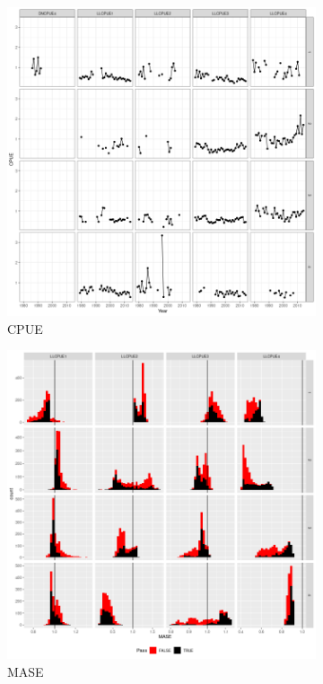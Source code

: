 \begin{figure}
        \begin{subfigure}[b]{0.5\textwidth}
           \includegraphics[width=\linewidth]{figures/cpue.png}
                \caption{CPUE}
                \label{fig:mase-u}
        \end{subfigure}%
                \begin{subfigure}[b]{0.5\textwidth} \includegraphics[width=\linewidth]{figures/mase-1.png}
                \caption{MASE}
                \label{fig:mase-score}
        \end{subfigure}%
        \caption{}\label{fig:mase}
\end{figure}


